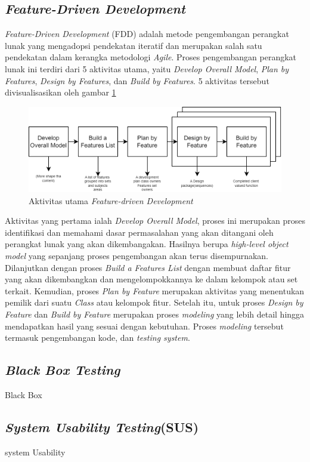 \subsection{\textit{Feature-Driven Development}}
\textit{Feature-Driven Development} (FDD) adalah metode pengembangan perangkat lunak yang mengadopsi pendekatan iteratif dan merupakan salah satu pendekatan dalam kerangka metodologi \textit{Agile}.
Proses pengembangan perangkat lunak ini terdiri dari 5 aktivitas utama, yaitu \textit{Develop Overall Model}, \textit{Plan by Features}, \textit{Design by Features}, dan \textit{Build by Features}.
5 aktivitas tersebut divisualisasikan oleh gambar \ref*{Fig:FDD-langkah}
\begin{figure}[H]
	\centering
	\includegraphics[width=\textwidth]{contents/chapter-2/images/FDD.png}
	\caption[Caption]{Aktivitas utama \textit{Feature-driven Development}\cite{palmer2001practical}}
	\label{Fig:FDD-langkah}
\end{figure}
Aktivitas yang pertama ialah \textit{Develop Overall Model}, proses ini merupakan proses identifikasi dan memahami dasar permasalahan yang akan ditangani oleh perangkat lunak yang akan dikembangakan.
Hasilnya berupa \textit{high-level object model} yang sepanjang proses pengembangan akan terus disempurnakan. Dilanjutkan dengan proses \textit{Build a Features List} dengan membuat daftar fitur yang akan dikembangkan dan mengelompokkannya ke dalam kelompok atau set terkait.
Kemudian, proses \textit{Plan by Feature} merupakan aktivitas yang menentukan pemilik dari suatu \textit{Class} atau kelompok fitur.
Setelah itu, untuk proses \textit{Design by Feature} dan \textit{Build by Feature} merupakan proses \textit{modeling} yang lebih detail hingga mendapatkan hasil yang sesuai dengan kebutuhan.
Proses \textit{modeling} tersebut termasuk pengembangan kode, dan \textit{testing system}.
\subsection{\textit{Black Box Testing}}
Black Box
\subsection{\textit{System Usability Testing}(SUS)}
system Usability
